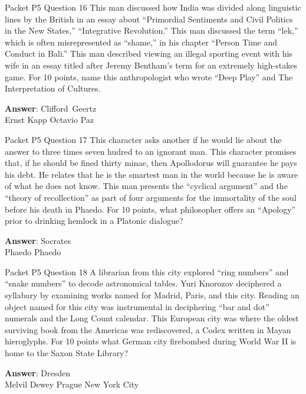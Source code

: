 \begin{frame}{Packet P5 Question 16}
This man discussed how India was divided along   linguistic lines by the British in an essay about ``Primordial   Sentiments and Civil Politics in the New States,'' “Integrative Revolution.” This man discussed the term ``lek,'' which is often misrepresented as ``shame,'' in his chapter ``Person Time and Conduct in Bali.'' This man described viewing an illegal sporting event with his wife in   an essay titled after Jeremy Bentham's term for an extremely high-stakes game. For 10 points, name this anthropologist who     wrote ``Deep Play''   and The Interpretation of Cultures.

\textbf{Answer}: Clifford\ Geertz\\
 Ernst Kapp
 Octavio Paz
\end{frame}

\begin{frame}{Packet P5 Question 17}
This character asks another if he would lie about the answer to three times seven hudred to an ignorant man. This character promises that, if he should be fined thirty minae, then Apollodorus will guarantee he pays his debt. He relates that he is the smartest man in the world because he is aware of what   he does not know. This man presents the ``cyclical argument'' and the ``theory of recollection'' as part of four arguments for the immortality   of the soul before   his death in Phaedo. For 10 points, what   philosopher offers an ``Apology'' prior   to drinking hemlock in a Platonic dialogue?

\textbf{Answer}: Socrates\\
 Phaedo
 Phaedo
\end{frame}

\begin{frame}{Packet P5 Question 18}
A librarian from this   city explored “ring numbers” and “snake numbers” to decode astronomical tables. Yuri Knorozov deciphered a syllabary by examining works named for Madrid, Paris, and this city. Reading an object named for this city was instrumental in deciphering “bar and dot” numerals and the Long Count calendar. This European city was where the oldest surviving book from the Americas was rediscovered, a Codex written in Mayan hieroglyphs. For 10 points what German city firebombed during World   War II is home to   the Saxon State Library?    

\textbf{Answer}: Dresden\\
 Melvil Dewey
 Prague
 New York City
\end{frame}

